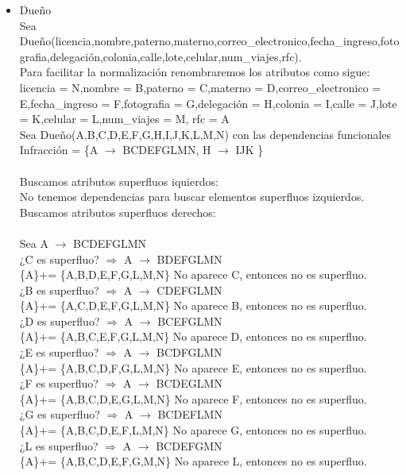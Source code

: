 \documentclass{article}
\begin{document}
\begin{itemize}
\item Dueño\\
Sea Dueño(licencia,nombre,paterno,materno,correo\_electronico,fecha\_ingreso,fotografia,delegación,colonia,calle,lote,celular,num\_viajes,rfc).\\
Para facilitar la normalización renombraremos los atributos como sigue:
licencia = N,nombre = B,paterno = C,materno = D,correo\_electronico = E,fecha\_ingreso = F,fotografia = G,delegación = H,colonia = I,calle = J,lote = K,celular = L,num\_viajes = M, rfc = A\\
Sea Dueño(A,B,C,D,E,F,G,H,I,J,K,L,M,N) con las dependencias funcionales 
Infracción = \{A $\rightarrow$ BCDEFGLMN, H $\rightarrow$ IJK  \} \\
\\
Buscamos atributos superfluos iquierdos:\\
No tenemos dependencias para buscar elementos superfluos izquierdos.\\
Buscamos atributos superfluos derechos:\\
\\
Sea A $\rightarrow$ BCDEFGLMN\\
¿C es superfluo? $\Rightarrow$ A $\rightarrow$ BDEFGLMN \\
\{A\}+= \{A,B,D,E,F,G,L,M,N\} No aparece C, entonces no es superfluo.\\
¿B es superfluo? $\Rightarrow$ A $\rightarrow$ CDEFGLMN \\
\{A\}+= \{A,C,D,E,F,G,L,M,N\} No aparece B, entonces no es superfluo.\\
¿D es superfluo? $\Rightarrow$ A $\rightarrow$ BCEFGLMN \\
\{A\}+= \{A,B,C,E,F,G,L,M,N\}  No aparece D, entonces no es superfluo.\\
¿E es superfluo? $\Rightarrow$ A $\rightarrow$ BCDFGLMN \\
\{A\}+= \{A,B,C,D,F,G,L,M,N\}  No aparece E, entonces no es superfluo.\\
¿F es superfluo? $\Rightarrow$ A $\rightarrow$ BCDEGLMN \\
\{A\}+= \{A,B,C,D,E,G,L,M,N\}  No aparece F, entonces no es superfluo.\\
¿G es superfluo? $\Rightarrow$ A $\rightarrow$ BCDEFLMN \\
\{A\}+= \{A,B,C,D,E,F,L,M,N\}  No aparece G, entonces no es superfluo.\\
¿L es superfluo? $\Rightarrow$ A $\rightarrow$ BCDEFGMN \\
\{A\}+= \{A,B,C,D,E,F,G,M,N\}  No aparece L, entonces no es superfluo.\\

\end{itemize}
\end{document}
